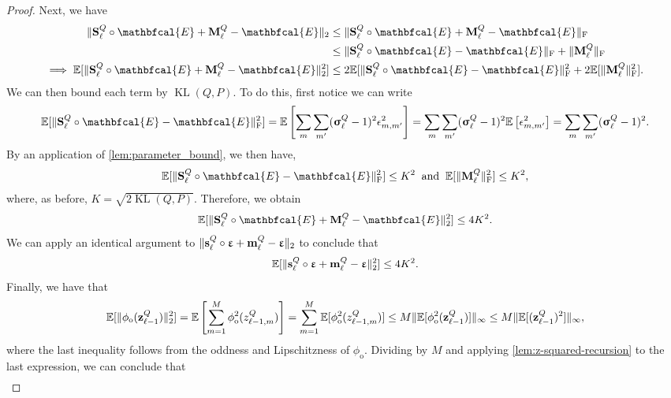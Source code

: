 \documentclass[twoside]{article}
\renewcommand{\ss}[1]{_{\text{#1}}}
\newcommand{\vm}{\mathbf{m}}
\newcommand{\vs}{\mathbf{s}}
\newcommand{\vz}{\mathbf{z}}
\newcommand{\vsigma}{\bm{\upsigma}}
\newcommand{\vep}{\bm{\upvarepsilon}}
\newcommand{\mM}{\mathbf{M}}
\newcommand{\mS}{\mathbf{S}}
\newcommand{\E}{\mathbb{E}}
\renewcommand{\P}{\mathbb{P}}
\newcommand{\Q}{\mathbb{Q}}
\renewcommand{\Q}{\ensuremath{Q}}
\renewcommand{\P}{\ensuremath{P}}
\newcommand{\had}{\circ}
\newcommand{\KL}{\operatorname{KL}}
\renewcommand{\ss}[1]{_{\text{#1}}}        %
\DeclarePairedDelimiter\norm{\|}{\|}             %
\theoremstyle{theoremstyle}
\begin{document}
\begin{proof}
Next, we have
\begin{align}
\norm{\mS^Q_\ell \had \mathbfcal{E} + \mM^Q_\ell - \mathbfcal{E}}_2 &\leq \norm{\mS^Q_\ell \had \mathbfcal{E} + \mM^Q_\ell - \mathbfcal{E}}\ss{F} \\
&\leq \norm{\mS^Q_\ell \had \mathbfcal{E}- \mathbfcal{E}}\ss{F} + \norm{\mM^Q_\ell}\ss{F} \\
\implies \E[\norm{\mS^Q_\ell \had \mathbfcal{E} + \mM^Q_\ell - \mathbfcal{E}}_2^2] &\leq 2\E[\norm{\mS^Q_\ell \had \mathbfcal{E}- \mathbfcal{E}}\ss{F}^2 + 2\E[\norm{\mM^Q_\ell}\ss{F}^2].
\end{align}
We can then bound each term by $\KL(\Q,\P)$. To do this, first notice we can write
\begin{align}
\E[\norm{\mS^Q_\ell \had \mathbfcal{E}- \mathbfcal{E}}\ss{F}^2] = \E\left[\sum_m \sum_{m'} (\vsigma^Q_\ell-1)^2\epsilon_{m,m'}^2\right] = \sum_m \sum_{m'} (\vsigma^Q_\ell-1)^2\E\left[\epsilon_{m,m'}^2\right] = \sum_m \sum_{m'} (\vsigma^Q_\ell-1)^2. \label{eqn:mat-norm-bound}
\end{align}
By an application of \cref{lem:parameter_bound}, we then have,
\begin{align}
\E[\norm{\mS^Q_\ell \had \mathbfcal{E}- \mathbfcal{E}}\ss{F}^2] \leq K^2 \;\; \text{and} \;\; \E[\norm{ \mM^Q_\ell }\ss{F}^2] \leq K^2, \label{eqn:first-terms-bound}
\end{align}
where, as before, $K = \sqrt{2\KL(\Q,\P)}$. Therefore, we obtain
\begin{align*}
    \E[\norm{\mS^Q_\ell \had \mathbfcal{E} + \mM^Q_\ell - \mathbfcal{E}}_2^2] \leq  4K^2.
\end{align*}
We can apply an identical argument to $\norm{\vs^Q_\ell \had \vep + \vm^Q_\ell - \vep}_2$ to conclude that 
\begin{align}
\E[\norm{\vs^Q_\ell \had \vep + \vm^Q_\ell - \vep}_2^2] \le  4K^2.
\end{align}
Finally, we have that
\begin{align}
    \E[\norm{\phi\ss{o}(\vz^Q_{\ell-1})}_2^2] 
    = \E\left[\sum_{m=1}^M \phi\ss{o}^2(z^Q_{\ell-1,m}) \right]
    = \sum_{m=1}^M \E[\phi\ss{o}^2(z^Q_{\ell-1,m}) ]
    \le M \norm{\E[\phi\ss{o}^2(\vz^Q_{\ell-1})]}_\infty 
    \le M \norm{\E[(\vz^Q_{\ell-1})^2]}_\infty,
\end{align}
where the last inequality follows from the oddness and Lipschitzness of $\phi\ss{o}$. Dividing by $M$ and applying \cref{lem:z-squared-recursion} to the last expression, we can conclude that
\begin{align}

\end{align}
\end{proof}
\end{document}
